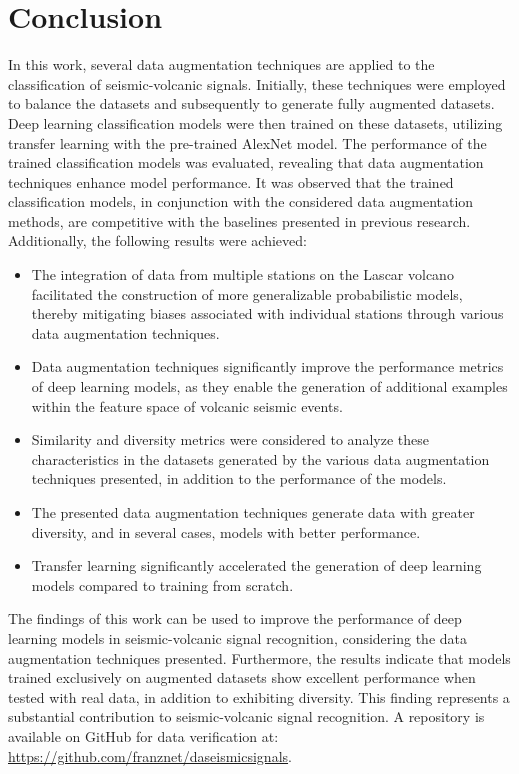 \documentclass[lettersize,journal]{IEEEtran}
\begin{document}
\section{Conclusion}\label{conclusion}
\noindent In this work, several data augmentation techniques are applied to the classification of seismic-volcanic signals. Initially, these techniques were employed to balance the datasets and subsequently to generate fully augmented datasets. Deep learning classification models were then trained on these datasets, utilizing transfer learning with the pre-trained AlexNet model.
The performance of the trained classification models was evaluated, revealing that data augmentation techniques enhance model performance.
It was observed that the trained classification models, in conjunction with the considered data augmentation methods, are competitive with the baselines presented in previous research. Additionally, the following results were achieved:
\begin{itemize}
\item The integration of data from multiple stations on the Lascar volcano facilitated the construction of more generalizable probabilistic models, thereby mitigating biases associated with individual stations through various data augmentation techniques.
\item Data augmentation techniques significantly improve the performance metrics of deep learning models, as they enable the generation of additional examples within the feature space of volcanic seismic events.
\item Similarity and diversity metrics were considered to analyze these characteristics in the datasets generated by the various data augmentation techniques presented, in addition to the performance of the models.
\item The presented data augmentation techniques generate data with greater diversity, and in several cases, models with better performance.
\item Transfer learning significantly accelerated the generation of deep learning models compared to training from scratch.
\end{itemize}
The findings of this work can be used to improve the performance of deep learning models in seismic-volcanic signal recognition, considering the data augmentation techniques presented. Furthermore, the results indicate that models trained exclusively on augmented datasets show excellent performance when tested with real data, in addition to exhibiting diversity. This finding represents a substantial contribution to seismic-volcanic signal recognition.
A repository is available on GitHub for data verification at: \href{https://github.com/franznet/daseismicsignals}{https://github.com/franznet/daseismicsignals}.
\end{document}
